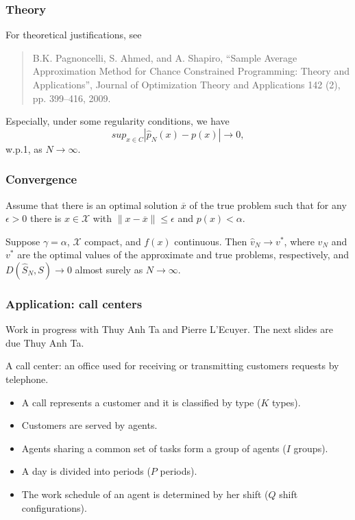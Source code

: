 \documentclass{beamer}
\begin{document}
\begin{frame}
\frametitle{Theory}

For theoretical justifications, see
\begin{quote}
B.K. Pagnoncelli, S. Ahmed, and A. Shapiro, ``Sample Average Approximation Method for Chance
Constrained Programming: Theory and Applications'', Journal of Optimization Theory and Applications 142 (2), pp. 399--416, 2009.
\end{quote}

\mbox{}

Especially, under some regularity conditions, we have
\[
sup_{x \in C} |\hat{p}_N(x) - p(x)| \rightarrow 0,
\]
w.p.1, as $N \rightarrow \infty$.

\end{frame}

\begin{frame}
\frametitle{Convergence}

Assume that  there is an optimal solution $\overline{x}$ of the true problem such that for any $\epsilon > 0$ there is $x \in \mathcal{X}$ with $\| x - \overline{x} \| \leq \epsilon$ and $p(x) < \alpha$.

\mbox{}

\begin{theorem}
Suppose $\gamma = \alpha$, $\mathcal{X}$ compact, and $f(x)$ continuous.
Then $\hat{v}_N \rightarrow v^*$, where $\hat{v}_N$ and $v^*$ are the optimal values of the approximate and true problems, respectively, and $D(\hat{S}_N,S) \rightarrow 0$ almost surely as $N \rightarrow \infty$.
\end{theorem}

\end{frame}

\begin{frame}
\frametitle{Application: call centers}

Work in progress with Thuy Anh Ta and Pierre L'Ecuyer.
The next slides are due Thuy Anh Ta.

\mbox{}

{\color{red}A call center}: an  office used for receiving or transmitting customers requests by {\color{red}telephone}.


	\begin{itemize}
		\item A {\color{blue}call} represents a customer and it is classified by {\color{blue}type} ($K$ types). 
		\item Customers are served by {\color{blue}agents}.
		\item Agents sharing a common set of tasks form a {\color{blue}group} of agents ($I$ groups).
		\item A day is divided into {\color{blue}periods} ($P$ periods).
		\item The work schedule of an agent is determined by her {\color{blue}shift} ($Q$ shift configurations).
\end{itemize}
	
\end{frame}
\end{document}
